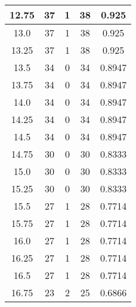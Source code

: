 \documentclass[letterpaper, 12pt]{article}
\begin{document}
\begin{longtable}{|c|c|c|c|c|}
\hline
12.75 & 37 & 1 & 38 & 0.925 \\
\hline
13.0 & 37 & 1 & 38 & 0.925 \\
\hline
13.25 & 37 & 1 & 38 & 0.925 \\
\hline
13.5 & 34 & 0 & 34 & 0.8947 \\
\hline
13.75 & 34 & 0 & 34 & 0.8947 \\
\hline
14.0 & 34 & 0 & 34 & 0.8947 \\
\hline
14.25 & 34 & 0 & 34 & 0.8947 \\
\hline
14.5 & 34 & 0 & 34 & 0.8947 \\
\hline
14.75 & 30 & 0 & 30 & 0.8333 \\
\hline
15.0 & 30 & 0 & 30 & 0.8333 \\
\hline
15.25 & 30 & 0 & 30 & 0.8333 \\
\hline
15.5 & 27 & 1 & 28 & 0.7714 \\
\hline
15.75 & 27 & 1 & 28 & 0.7714 \\
\hline
16.0 & 27 & 1 & 28 & 0.7714 \\
\hline
16.25 & 27 & 1 & 28 & 0.7714 \\
\hline
16.5 & 27 & 1 & 28 & 0.7714 \\
\hline
16.75 & 23 & 2 & 25 & 0.6866 \\
\hline
\end{longtable}
\end{document}
